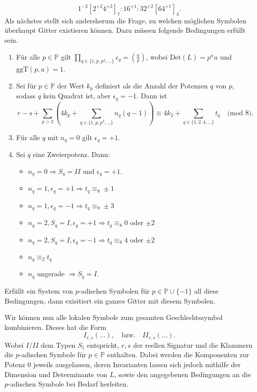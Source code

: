 \documentclass[12pt,a4paper,halfparskip,headsepline,bibtotocnumbered]{scrreprt}
\theoremstyle{nummermitklammern}
\theoremstyle{nonumberbreak}
\renewcommand{\P}{\mathbb{P}}
\newcommand{\Det}{\text{Det}}
\begin{document}
\begin{equation*}
	1^{-2} \left[2^{+2} 4^{+3} \right]_7 : 16^{+1} : 32^{+2} \left[ 64^{+1} \right]_3.
\end{equation*}
Als nächstes stellt sich andersherum die Frage, zu welchen möglichen Symbolen überhaupt Gitter existieren können. Dazu müssen folgende Bedingungen erfüllt sein.
\begin{enumerate}[label=(\roman*)]
	\item Für alle $p \in \P$ gilt $\prod_{q \in \lbrace 1, p, p^2, \dots \rbrace} \epsilon_q = \left( \frac{a}{p} \right)$, wobei $\Det(L) = p^\alpha a$ und $\text{ggT}(p,a) = 1$.
	\item Sei für $p \in \P$ der Wert $k_p$ definiert als die Anzahl der Potenzen $q$ von $p$, sodass $q$ kein Quadrat ist, aber $\epsilon_q = -1$. Dann ist
		\begin{equation*}
			r - s + \sum_{p > 2} \left( 4 k_p + \sum_{q \in \lbrace 1, p, p^2, \dots \rbrace} n_q (q-1) \right) \equiv 4 k_2 + \sum_{q \in \lbrace 1, 2, 4, \dots \rbrace} t_q \quad \text{(mod } 8 \text{).}
		\end{equation*}
	\item Für alle $q$ mit $n_q = 0$ gilt $\epsilon_q = +1$.
	\item Sei $q$ eine Zweierpotenz. Dann:
		\begin{itemize}
			\item $n_q = 0 \Rightarrow S_q = II$ und $\epsilon_q = +1$.
			\item $n_q = 1, \epsilon_q = +1 \Rightarrow t_q \equiv_8 \pm 1$
			\item $n_q = 1, \epsilon_q = -1 \Rightarrow t_q \equiv_8 \pm 3$
			\item $n_q = 2, S_q = I, \epsilon_q = +1 \Rightarrow t_q \equiv_8 0$ oder $\pm 2$
			\item $n_q = 2, S_q = I, \epsilon_q = -1 \Rightarrow t_q \equiv_8 4$ oder $\pm 2$
			\item $n_q \equiv_2 t_q$
			\item $n_q$ ungerade $\Rightarrow S_q = I$.
		\end{itemize}
\end{enumerate}

Erfüllt ein System von $p$-adischen Symbolen für $p \in \P \cup \lbrace -1 \rbrace$ all diese Bedingungen, dann exisitiert ein ganzes Gitter mit diesem Symbolen.\par
Wir können nun alle lokalen Symbole zum gesamten Geschlechtssymbol kombinieren. Dieses hat die Form
\begin{equation*}
	I_{r,s}(...), \quad \text{bzw.}\quad II_{r,s}(...).
\end{equation*}
Wobei $I/II$ dem Typen $S_1$ entspricht, $r,s$ der reellen Signatur und die Klammern die $p$-adischen Symbole für $p \in \P$ enthalten. Dabei werden die Komponenten zur Potenz $0$ jeweils ausgelassen, deren Invarianten lassen sich jedoch mithilfe der Dimension und Determinante von $L$, sowie den angegebenen Bedingungen an die $p$-adischen Symbole bei Bedarf herleiten.
\end{document}
